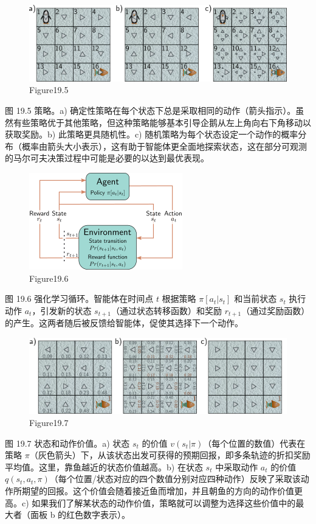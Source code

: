 \begin{figure}[ht!]
\centering
\includegraphics[width=0.7\linewidth]{png/chapter19/ReinforcePolicy.png}
\caption{Figure19.5}
\end{figure}
图 19.5 策略。a) 确定性策略在每个状态下总是采取相同的动作（箭头指示）。虽然有些策略优于其他策略，但这种策略能够基本引导企鹅从左上角向右下角移动以获取奖励。b) 此策略更具随机性。c) 随机策略为每个状态设定一个动作的概率分布（概率由箭头大小表示），这有助于智能体更全面地探索状态，这在部分可观测的马尔可夫决策过程中可能是必要的以达到最优表现。

\begin{figure}[ht!]
\centering
\includegraphics[width=0.7\linewidth]{png/chapter19/ReinforceMDPLoop.png}
\caption{Figure19.6}
\end{figure}
图 19.6 强化学习循环。智能体在时间点 \(t\) 根据策略 \(\pi[a_t|s_t]\) 和当前状态 \(s_t\) 执行动作 \(a_t\)，引发新的状态 \(s_{t+1}\)（通过状态转移函数）和奖励 \(r_{t+1}\)（通过奖励函数）的产生。这两者随后被反馈给智能体，促使其选择下一个动作。

\begin{figure}[ht!]
\centering
\includegraphics[width=0.7\linewidth]{png/chapter19/ReinforceValueOfAction.png}
\caption{Figure19.7}
\end{figure}
图 19.7 状态和动作价值。a) 状态 \(s_t\) 的价值 \(v(s_t|\pi)\)（每个位置的数值）代表在策略 \(\pi\)（灰色箭头）下，从该状态出发可获得的预期回报，即多条轨迹的折扣奖励平均值。这里，靠鱼越近的状态价值越高。b) 在状态 \(s_t\) 中采取动作 \(a_t\) 的价值 \(q(s_t, a_t, \pi)\)（每个位置/状态对应的四个数值分别对应四种动作）反映了采取该动作所期望的回报。这个价值会随着接近鱼而增加，并且朝鱼的方向的动作价值更高。c) 如果我们了解某状态的动作价值，策略就可以调整为选择这些价值中的最大者（面板 b 的红色数字表示）。

